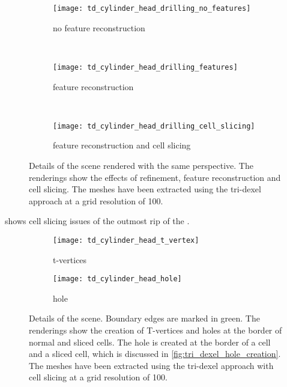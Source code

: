 \begin{figure}
	\centering
	\begin{subfigure}[b]{0.67\textwidth}
		\centering
		\texttt{[image: td\_cylinder\_head\_drilling\_no\_features]}
		\caption{no feature reconstruction}
		\label{fig:td_cylinder_head_drilling_no_features}
	\end{subfigure}
	\bigskip\\
	\begin{subfigure}[b]{0.67\textwidth}
		\centering
		\texttt{[image: td\_cylinder\_head\_drilling\_features]}
		\caption{feature reconstruction}
		\label{fig:td_cylinder_head_drilling_features}
	\end{subfigure}
	\bigskip\\
	\begin{subfigure}[b]{0.67\textwidth}
		\centering
		\texttt{[image: td\_cylinder\_head\_drilling\_cell\_slicing]}
		\caption{feature reconstruction and cell slicing}
		\label{fig:td_cylinder_head_drilling_cell_slicing}
	\end{subfigure}
	\caption[Tri-dexel feature reconstruction and cell slicing]{
		Details of the \cylinderhead scene rendered with the same perspective.
		The renderings show the effects of refinement, feature reconstruction and cell slicing.
		The meshes have been extracted using the tri-dexel approach at a grid resolution of 100.
	}
	\label{fig:td_features_and_cell_slicing}
\end{figure}

 shows cell slicing issues of the outmost rip of the \cylinderhead.

\begin{figure}
	\centering
	\begin{subfigure}[b]{0.49\textwidth}
		\centering
		\texttt{[image: td\_cylinder\_head\_t\_vertex]}
		\caption{t-vertices}
		\label{fig:td_cylinder_head_t_vertex}
	\end{subfigure}
	\begin{subfigure}[b]{0.49\textwidth}
		\centering
		\texttt{[image: td\_cylinder\_head\_hole]}
		\caption{hole}
		\label{fig:td_cylinder_head_hole}
	\end{subfigure}
	\caption[Tri-dexel T-vertices and holes]{
		Details of the \cylinderhead scene.
		Boundary edges are marked in green.
		The renderings show the creation of T-vertices and holes at the border of normal and sliced cells.
		The hole is created at the border of a cell and a sliced cell, which is discussed in \cref{fig:tri_dexel_hole_creation}.
		The meshes have been extracted using the tri-dexel approach with cell slicing at a grid resolution of 100.
	}
	\label{fig:td_cylinder_head_issues}
\end{figure}

